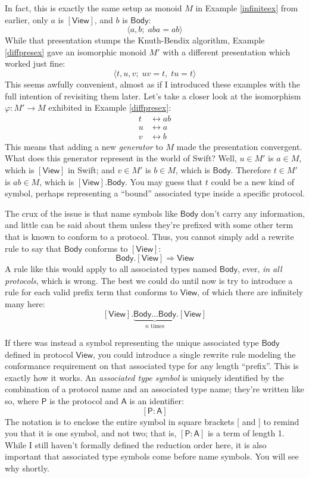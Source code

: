 \documentclass[a4paper,headsepline,bibliography=totoc,toc=flat,fleqn,twoside=semi]{scrbook}
\theoremstyle{definition}
\theoremstyle{definition}
\theoremstyle{definition}
\newcommand{\namesym}[1]{\mathsf{#1}}
\newcommand{\proto}[1]{\bm{\mathsf{#1}}}
\newcommand{\protosym}[1]{[\proto{#1}]}
\newcommand{\assocsym}[2]{[\proto{#1}\colon\namesym{#2}]}
\begin{document}
In fact, this is exactly the same setup as monoid $M$ in Example \ref{infiniteex} from earlier, only $a$ is $\protosym{View}$, and $b$ is $\namesym{Body}$:
\[\langle a, b;\;aba=ab \rangle\]
While that presentation stumps the Knuth-Bendix algorithm, Example \ref{diffpresex} gave an isomorphic monoid $M'$ with a different presentation which worked just fine:
\[\langle t, u, v;\;uv=t,\;tu=t\rangle\]
This seems awfully convenient, almost as if I introduced these examples with the full intention of revisiting them later. Let's take a closer look at the isomorphism $\varphi\colon M'\rightarrow M$ exhibited in Example \ref{diffpresex}:
\begin{align*}
t&\leftrightarrow ab\\
u&\leftrightarrow a\\
v&\leftrightarrow b
\end{align*}
This means that adding a new \emph{generator} to $M$ made the presentation convergent. What does this generator represent in the world of Swift? Well, $u\in M'$ is $a\in M$, which is $\protosym{View}$ in Swift; and $v\in M'$ is $b\in M$, which is $\namesym{Body}$. Therefore $t\in M'$ is $ab\in M$, which is $\protosym{View}.\namesym{Body}$. You may guess that $t$ could be a new kind of symbol, perhaps representing a ``bound'' associated type inside a specific protocol.

 The crux of the issue is that name symbols like $\namesym{Body}$ don't carry any information, and little can be said about them unless they're prefixed with some other term that is known to conform to a protocol. Thus, you cannot simply add a rewrite rule to say that $\namesym{Body}$ conforms to $\protosym{View}$:
\[\namesym{Body}.\protosym{View}\Rightarrow\namesym{View}\]
A rule like this would apply to all associated types named $\namesym{Body}$, ever, \emph{in all protocols}, which is wrong. The best we could do until now is try to introduce a rule for each valid prefix term that conforms to $\proto{View}$, of which there are infinitely many here:
\[\protosym{View}.\underbrace{\namesym{Body}\ldots\namesym{Body}}_{\textrm{$n$ times}}.\protosym{View}\]

If there was instead a symbol representing the unique associated type $\namesym{Body}$ defined in protocol $\proto{View}$, you could introduce a single rewrite rule modeling the conformance requirement on that associated type for any length ``prefix''. This is exactly how it works. An \emph{associated type symbol} is uniquely identified by the combination of a protocol name and an associated type name; they're written like so, where $\proto{P}$ is the protocol and $\namesym{A}$ is an identifier:
\[\assocsym{P}{A}\]
The notation is to enclose the entire symbol in square brackets [ and ] to remind you that it is one symbol, and not two; that is, $\assocsym{P}{A}$ is a term of length 1. While I still haven't formally defined the reduction order here, it is also important that associated type symbols come before name symbols. You will see why shortly.
\end{document}

